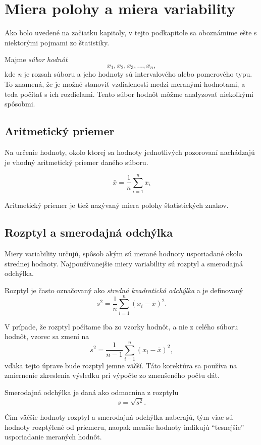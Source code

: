 \section{Miera polohy a miera variability}
Ako bolo uvedené na začiatku kapitoly, v tejto podkapitole sa oboznámime ešte s niektorými pojmami zo štatistiky.

Majme \textit{súbor hodnôt}
 \begin{equation}
x_1,x_2,x_3,...,x_n,
\end{equation}  
kde \textit{n} je rozsah súboru a jeho hodnoty sú intervalového alebo pomerového typu. To znamená, že je možné  stanoviť vzdialenosti medzi meranými hodnotami, a teda počítať s ich rozdielami. Tento súbor hodnôt môžme analyzovať niekoľkými spôsobmi.

\subsection{Aritmetický priemer}
Na určenie hodnoty, okolo ktorej sa hodnoty jednotlivých pozorovaní nachádzajú je vhodný aritmetický priemer daného súboru. 

\begin{equation}
\bar{x} = \frac{1}{n} \sum\limits_{i=1}^{n} x_i
\end{equation}

Aritmetický priemer je tiež nazývaný miera polohy štatistických znakov.

\subsection{Rozptyl a smerodajná odchýlka}

Miery variability určujú, spôsob akým sú merané hodnoty usporiadané okolo strednej hodnoty. Najpoužívanejšie miery variability sú rozptyl a smerodajná odchýlka.

Rozptyl je  často označovaný ako \textit{stredná kvadratická odchýlka} a je definovaný
\begin{equation}
s^2 = \frac{1}{n}\sum\limits_{i=1}^{n}(x_i - \bar{x})^2.
\end{equation}

V prípade, že rozptyl počítame iba zo vzorky hodnôt, a nie z celého súboru hodnôt, vzorec sa zmení na
 \begin{equation}
s^2 = \frac{1}{n-1}\sum\limits_{i=1}^{n}(x_i - \bar{x})^2,
\end{equation}
vďaka tejto úprave bude rozptyl jemne väčší. Táto korektúra sa používa na zmiernenie zkreslenia výsledku pri výpočte zo zmenšeného počtu dát.

Smerodajná odchýlka je daná ako odmocnina z rozptylu
\begin{equation}
s = \sqrt{s^2}.
\end{equation}

Čím väčšie hodnoty rozptyl a smerodajná odchýlka naberajú, tým viac sú hodnoty rozptýlené od priemeru, naopak menšie hodnoty indikujú ``tesnejšie'' usporiadanie meraných hodnôt.


